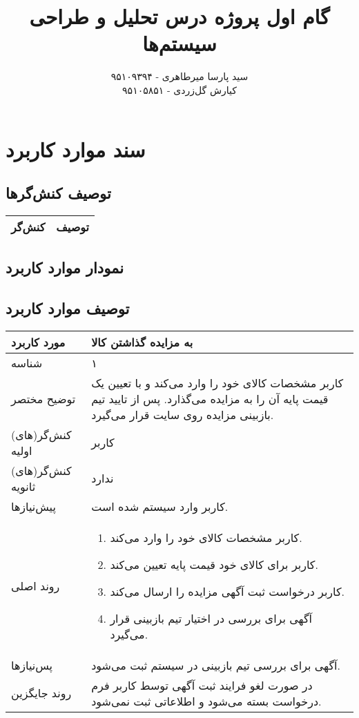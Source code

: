 \documentclass{article}
\title{\textbf{گام اول پروژه درس تحلیل و طراحی سیستم‌ها}}
\author{سید پارسا میرطاهری - ۹۵۱۰۹۳۹۴ \\ کیارش گل‌زردی - ۹۵۱۰۵۸۵۱}
\begin{document}
\date{}

\maketitle

\section{سند موارد کاربرد}

\subsection{توصیف کنش‌گرها}

\begin{center}
\begin{tabular} {|c|c|}
\hline
کنش‌گر & توصیف \\
\hline	
\end{tabular}	
\end{center}

\subsection{نمودار موارد کاربرد}

\subsection{توصیف موارد کاربرد}

\begin{center}
\bgroup
\def\arraystretch{1.5}
\begin{tabular} {|p{}|p{}|}
\hline
 مورد کاربرد & 
 به مزایده گذاشتن کالا
\\ \hline
 شناسه &
۱
\\ \hline
توضیح مختصر &
کاربر مشخصات کالای خود را وارد می‌کند و با تعیین یک قیمت پایه آن را به مزایده می‌گذارد.
پس از تایید تیم بازبینی مزایده روی سایت قرار می‌گیرد.
\\ \hline
کنش‌گر(های) اولیه &
کاربر
\\ \hline
کنش‌گر(های) ثانویه &
ندارد
\\ \hline
پیش‌نیازها &
کاربر وارد سیستم شده است.
\\ \hline
روند اصلی &
\begin{enumerate}[nosep,topsep=0cm]
\item
کاربر مشخصات کالای خود را وارد می‌کند.
\item
کاربر برای کالای خود قیمت پایه تعیین می‌کند.
\item
کاربر درخواست ثبت آگهی مزایده را ارسال می‌کند.
\item
آگهی برای بررسی در اختیار تیم بازبینی قرار می‌گیرد.
\end{enumerate}
\\ \hline
پس‌نیازها &
آگهی برای بررسی تیم بازبینی در سیستم ثبت می‌شود.
\\ \hline
روند جایگزین &
در صورت لغو فرایند ثبت آگهی توسط کاربر فرم درخواست بسته می‌شود و اطلاعاتی ثبت نمی‌شود.
\\ \hline
\end{tabular}
\egroup
\end{center}
\end{document}
